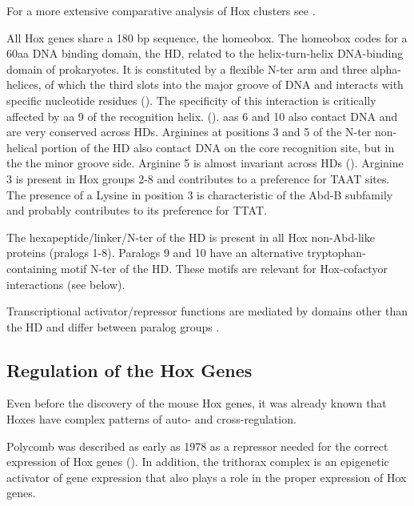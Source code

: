 
For a more extensive comparative analysis of Hox clusters see \cite{Duboule2007}.

All Hox genes share a 180 bp sequence, the homeobox. The homeobox codes for a 60aa DNA binding domain, the \ac{HD}, related to the helix-turn-helix DNA-binding domain of prokaryotes. It is constituted by a flexible \ac{N-ter} arm and three alpha-helices, of which the third slots into the major groove of DNA and interacts with specific nucleotide residues (\cite{Treisman1992}). The specificity of this interaction is critically affected by \ac{aa} 9 of the recognition helix. (\cite{Treisman1992}). \acp{aa} 6 and 10 also contact DNA and are very conserved across \acp{HD}. Arginines at positions 3 and 5 of the \ac{N-ter} non-helical portion of the \ac{HD} also contact DNA on the core recognition site, but in the the minor groove side. Arginine 5 is almost invariant across \acp{HD} (\cite{Treisman1992}). Arginine 3 is present in Hox groups 2-8 and contributes to a preference for TAAT sites. The presence of a Lysine in position 3 is characteristic of the \ac{Abd-B} subfamily and probably contributes to its preference for TTAT.

The hexapeptide/linker/\ac{N-ter} of the \ac{HD} is present in all Hox non-Abd-like proteins (pralogs 1-8). Paralogs 9 and 10 have an alternative tryptophan-containing motif \ac{N-ter} of the \ac{HD}. These motifs are relevant for Hox-cofactyor interactions (see below).

Transcriptional activator/repressor functions are mediated by domains other than the \ac{HD} and differ between paralog groups \cite{ref}.

\subsection{Regulation of the Hox Genes}

Even before the discovery of the mouse Hox genes, it was already known that Hoxes have complex patterns of auto- and cross-regulation. 


Polycomb was described as early as 1978 as a repressor needed for the correct expression of Hox genes (\cite{Lewis1978}). In addition, the trithorax complex is an epigenetic activator of gene expression that also plays a role in the proper expression of Hox genes.%


